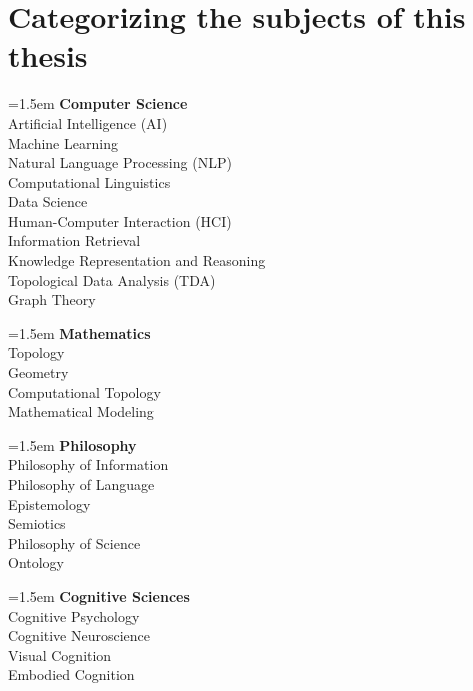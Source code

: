 \section{Categorizing the subjects of this thesis}
\raggedcolumns
\begin{multicols}{2}

\noindent\hangindent=1.5em \textbf{Computer Science} \\
Artificial Intelligence (AI) \\
Machine Learning \\
Natural Language Processing (NLP) \\
Computational Linguistics \\
Data Science \\
Human-Computer Interaction (HCI) \\
Information Retrieval \\
Knowledge Representation and Reasoning \\
Topological Data Analysis (TDA) \\
Graph Theory \\
\vspace{4mm}

\noindent\hangindent=1.5em \textbf{Mathematics} \\
Topology \\
Geometry \\
Computational Topology \\
Mathematical Modeling \\
\vspace{4mm}

\noindent\hangindent=1.5em \textbf{Philosophy} \\
Philosophy of Information \\
Philosophy of Language \\
Epistemology \\
Semiotics \\
Philosophy of Science \\
Ontology \\
\vspace{4mm}

\noindent\hangindent=1.5em \textbf{Cognitive Sciences} \\
Cognitive Psychology \\
Cognitive Neuroscience \\
Visual Cognition \\
Embodied Cognition \\
\vspace{4mm}


\end{multicols}
